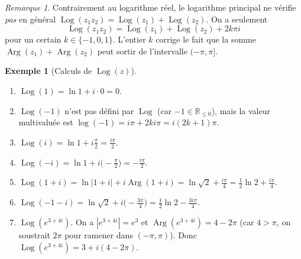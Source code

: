 \documentclass[12pt,a4paper,openany]{book}
\theoremstyle{definition}
\newtheorem{exemple}[definition]{Exemple}
\theoremstyle{plain}
\theoremstyle{remark}
\newtheorem{remarque}[definition]{Remarque}
\newcommand{\R}{\mathbb{R}}
\DeclareMathOperator{\Arg}{Arg}
\DeclareMathOperator{\Log}{Log}
\newcommand{\abs}[1]{\left|#1\right|}
\begin{document}
\begin{remarque}\label{rem:log-pas-morphisme}
Contrairement au logarithme réel, le logarithme principal ne vérifie \emph{pas}
en général $\Log(z_1 z_2) = \Log(z_1) + \Log(z_2)$. On a seulement
\[
  \Log(z_1 z_2) = \Log(z_1) + \Log(z_2) + 2k\pi i
\]
pour un certain $k \in \{-1, 0, 1\}$. L'entier $k$ corrige le fait que la somme
$\Arg(z_1) + \Arg(z_2)$ peut sortir de l'intervalle $(-\pi,\pi]$.
\end{remarque}

\begin{exemple}[Calculs de $\Log(z)$]\label{ex:calculs-log}
\leavevmode
\begin{enumerate}[label=(\alph*)]
  \item $\Log(1) = \ln 1 + i \cdot 0 = 0$.
  \item $\Log(-1)$ n'est pas défini par $\Log$ (car $-1 \in \R_{\leq 0}$), mais la valeur multivaluée est $\log(-1) = i\pi + 2ki\pi = i(2k+1)\pi$.
  \item $\Log(i) = \ln 1 + i\frac{\pi}{2} = \frac{i\pi}{2}$.
  \item $\Log(-i) = \ln 1 + i\bigl(-\frac{\pi}{2}\bigr) = -\frac{i\pi}{2}$.
  \item $\Log(1+i) = \ln\abs{1+i} + i\Arg(1+i) = \ln\sqrt{2} + \frac{i\pi}{4}
         = \frac{1}{2}\ln 2 + \frac{i\pi}{4}$.
  \item $\Log(-1-i) = \ln\sqrt{2} + i\bigl(-\frac{3\pi}{4}\bigr)
         = \frac{1}{2}\ln 2 - \frac{3i\pi}{4}$.
  \item $\Log(e^{3+4i})$. On a $\abs{e^{3+4i}} = e^3$ et $\Arg(e^{3+4i}) = 4 - 2\pi$ (car $4 > \pi$, on soustrait $2\pi$ pour ramener dans $(-\pi,\pi)$). Donc $\Log(e^{3+4i}) = 3 + i(4 - 2\pi)$.
\end{enumerate}
\end{exemple}
\end{document}
